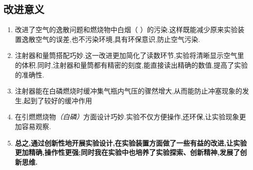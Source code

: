 \documentclass[11pt,a4paper,titlepage,twocolumn]{ctexart}
\begin{document}
	\subsection{改进意义}
	
	\begin{enumerate}
		\item 改进了空气的逸散问题和燃烧物中白烟（ ）的污染.这样既能减少原来实验装置逸散空气的误差,也不污染环境,具有环保意识,防止空气污染.
		\item 注射器和量筒搭配巧妙.这一改进更加简化了读数环节,实验将清晰显示空气里 的体积.同时,注射器和量筒都有精密的刻度,能直接读出精确的数值,提高了实验的准确性.
		\item 注射器能在白磷燃烧时缓冲集气瓶内气压的骤然增大,从而能防止冲塞现象的发生,起到了较好的缓冲作用
		\item 在引燃燃烧物\textit{（白磷）}方面设计巧妙.实验不仅方便操作,还环保,让实验现象更加容易观察.
		\item \textbf{总之,通过创新性地开展实验设计,在实验装置方面做了一些有益的改进,让实验更加精确,操作性更强;同时我在实验中也培养了实验探索、创新精神,发展了创新思维.}
	\end{enumerate}
	
\end{document}
